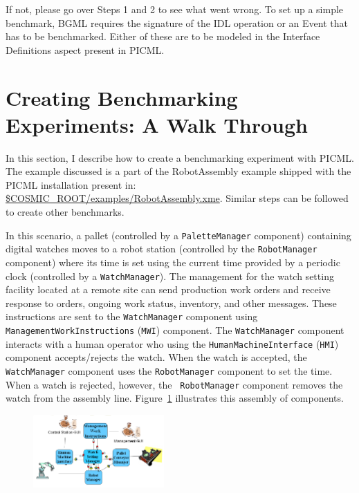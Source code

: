 \documentclass[onecolumn]{article}
\begin{document}
If not, please go over Steps 1 and 2 to see what went wrong.  To set
up a simple benchmark, BGML requires the signature of the IDL
operation or an Event that has to be benchmarked. Either of these
are to be modeled in the Interface Definitions aspect present in PICML.

\section* {Creating Benchmarking Experiments: A Walk Through}
In this section, I describe how to create a benchmarking experiment
with PICML. The example discussed is a part of the RobotAssembly
example shipped with the PICML installation present in:
\url{\$COSMIC_ROOT/examples/RobotAssembly.xme}. Similar steps can be
followed to create other benchmarks.

In this scenario, a pallet (controlled by a {\tt Palette\-Manager}
component) containing digital watches moves to a robot station
(controlled by the {\tt Robot\-Manager} component) where its time is
set using the current time provided by a periodic clock (controlled by
a {\tt Watch\-Manager}).  The management for the watch setting
facility located at a remote site can send production work orders and
receive response to orders, ongoing work status, inventory, and other
messages. These instructions are sent to the {\tt Watch\-Manager}
component using {\tt Management\-Work\-Instructions} ({\tt MWI})
component. The {\tt Watch\-Manager} component interacts with a human
operator who using the {\tt Human\-Machine\-Interface} ({\tt HMI})
component accepts/rejects the watch.  When the watch is accepted, the
{\tt Watch\-Manager} component uses the {\tt Robot\-Manager} component
to set the time.  When a watch is rejected, however, the {\tt
Robot\-Manager} component removes the watch from the assembly line.
Figure~\ref{fig:robotassembly} illustrates this assembly of
components.

\begin{figure}[htpb]
\begin{center}
\includegraphics[width=5cm]{RobotAssembly.png}
\label{fig:robotassembly}
\end{center}
\end{figure}
\end{document}
